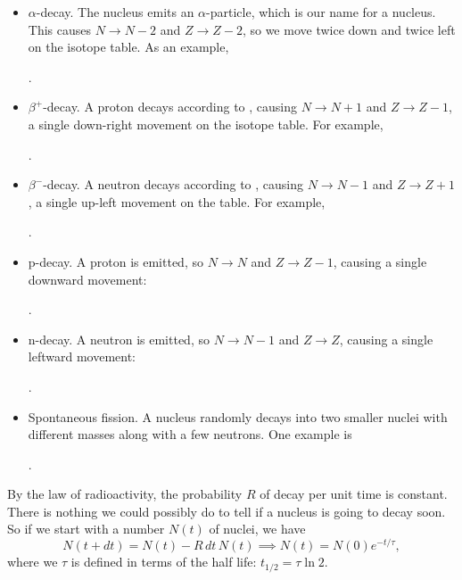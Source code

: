 \documentclass[../p052main.tex]{subfiles}
\begin{document}
\begin{itemize}
    \item $\alpha$-decay.
    The nucleus emits an $\alpha$-particle, which is our name for a  nucleus.
    This causes $N \to N-2$ and $Z \to Z-2$, so we move twice down and twice left on the isotope table.
    As an example,
    \begin{center}
        .
    \end{center}
    
    \item $\beta^+$-decay.
    A proton decays according to , causing $N \to N+1$ and $Z \to Z-1$, a single down-right movement on the isotope table.
    For example,
    \begin{center}
        .
    \end{center}
    
    \item $\beta^-$-decay.
    A neutron decays according to , causing $N \to N-1$ and $Z \to Z+1$, a single up-left movement on the table.
    For example,
    \begin{center}
        .
    \end{center}
    
    \item p-decay.
    A proton is emitted, so $N \to N$ and $Z \to Z-1$, causing a single downward movement:
    \begin{center}
        .
    \end{center}

    \item n-decay.
    A neutron is emitted, so $N \to N-1$ and $Z \to Z$, causing a single leftward movement:
    \begin{center}
        .
    \end{center}
    
    \item Spontaneous fission.
    A nucleus randomly decays into two smaller nuclei with different masses along with a few neutrons.
    One example is
    \begin{center}
        .
    \end{center}
\end{itemize}
By the law of radioactivity, the probability $R$ of decay per unit time is constant.
There is nothing we could possibly do to tell if a nucleus is going to decay soon.
So if we start with a number $N(t)$ of nuclei, we have
\[ N(t + dt) = N(t) - R \,dt\, N(t) \implies N(t) = N(0) e^{-t / \tau}, \]
where we $\tau$ is defined in terms of the half life: $t_{1 / 2} = \tau \ln 2$.
\end{document}
